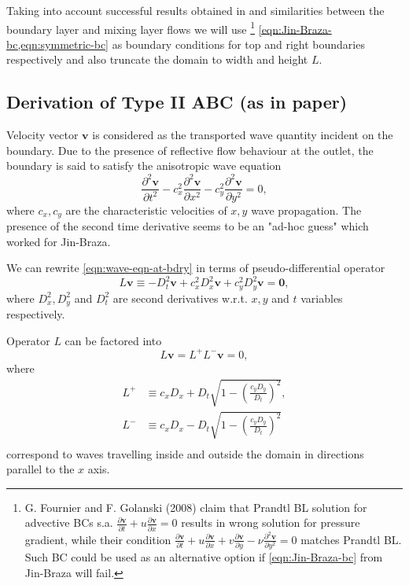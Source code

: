 \documentclass{article}
\numberwithin{equation}{section}
\begin{document}
Taking into account successful results obtained in \cite{Kourta:1987, Jin:1993, Persillon:1998} and similarities between the boundary layer and mixing layer flows we will use
\footnote{G. Fournier and F. Golanski (2008) claim that Prandtl BL solution for advective BCs s.a. $\frac{\partial \boldsymbol{v}}{\partial t} + u\frac{\partial \boldsymbol{v}}{\partial x}=0$ results in wrong solution for pressure gradient, while their condition $\frac{\partial \boldsymbol{v}}{\partial t}+u \frac{\partial \boldsymbol{v}}{\partial x}+v \frac{\partial \boldsymbol{v}}{\partial y}-\nu \frac{\partial^2 \boldsymbol{v}}{\partial y^2}=0$ matches Prandtl BL. Such BC could be used as an alternative option if \cref{eqn:Jin-Braza-bc} from Jin-Braza\cite{Jin:1993} will fail.} 
\cref{eqn:Jin-Braza-bc,eqn:symmetric-bc} as boundary conditions for top and right boundaries respectively and also truncate the domain to width and height $L$.


\pagebreak
\subsection{Derivation of Type II ABC (as in paper)}\label{subsec:non-reflecting-abc}
Velocity vector $\boldsymbol{v}$ is considered as the transported wave quantity incident on the boundary. 
Due to the presence of reflective flow behaviour at the outlet, the boundary is said to satisfy the anisotropic wave equation
\begin{equation}\label{eqn:wave-eqn-at-bdry}
	\frac{\partial ^2 \boldsymbol{v}}{\partial t^2}-c_x^2\frac{\partial ^2 \boldsymbol{v}}{\partial x^2}-c_y^2\frac{\partial ^2 \boldsymbol{v}}{\partial y^2}=0,
\end{equation}
where $c_x,c_y$ are the characteristic velocities of $x,y$ wave propagation. The presence of the second time derivative seems to be an "ad-hoc guess" which worked for Jin-Braza\cite{Jin:1993}. 

We can rewrite \cref{eqn:wave-eqn-at-bdry} in terms of pseudo-differential operator
\begin{equation*}
	L\boldsymbol{v}\equiv -D_t^2\boldsymbol{v}+c_x^2D_x^2\boldsymbol{v}+c_y^2D_y^2\boldsymbol{v=0},
\end{equation*}
where $D^2_x,D^2_y$ and $D^2_t$ are second derivatives w.r.t. $x,y$ and $t$ variables respectively. 

Operator $L$ can be factored into
\begin{equation*}
	L\boldsymbol{v}=L^+L^-\boldsymbol{v}=0,
\end{equation*}
where
\begin{align*}
	L^+&\equiv c_x D_x + D_t\sqrt{1-\left( \frac{c_y D_y}{D_t}\right)^2},\\
	L^-&\equiv c_x D_x - D_t\sqrt{1-\left( \frac{c_y D_y}{D_t}\right)^2}\\
\end{align*}
correspond to waves travelling inside and outside the domain in directions parallel to the $x$ axis. 
\end{document}
